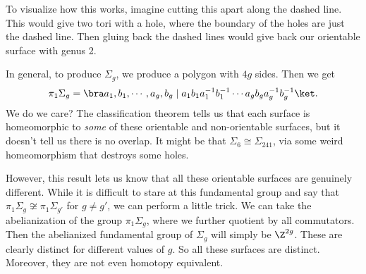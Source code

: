 \documentclass[a4paper]{article}
\begin{document}
\begin{eg}
\begin{center}
  \end{center}
  To visualize how this works, imagine cutting this apart along the dashed line. This would give two tori with a hole, where the boundary of the holes are just the dashed line. Then gluing back the dashed lines would give back our orientable surface with genus 2.
  \begin{center}
  \end{center}
  In general, to produce $\Sigma_g$, we produce a polygon with $4g$ sides. Then we get
  \[
    \pi_1 \Sigma_g = \bra a_1, b_1, \cdots, a_g, b_g\mid a_1 b_1 a_1^{-1} b_1^{-1} \cdots a_g b_g a_g^{-1}b_g^{-1}\ket.
  \]
  We do we care? The classification theorem tells us that each surface is homeomorphic to \emph{some} of these orientable and non-orientable surfaces, but it doesn't tell us there is no overlap. It might be that $\Sigma_6\cong \Sigma_{241}$, via some weird homeomorphism that destroys some holes.

  However, this result lets us know that all these orientable surfaces are genuinely different. While it is difficult to stare at this fundamental group and say that $\pi_1 \Sigma_g \not\cong \pi_1 \Sigma_{g'}$ for $g\not= g'$, we can perform a little trick. We can take the abelianization of the group $\pi_1 \Sigma_g$, where we further quotient by all commutators. Then the abelianized fundamental group of $\Sigma_g$ will simply be $\Z^{2g}$. These are clearly distinct for different values of $g$. So all these surfaces are distinct. Moreover, they are not even homotopy equivalent.
\end{eg}
\end{document}
